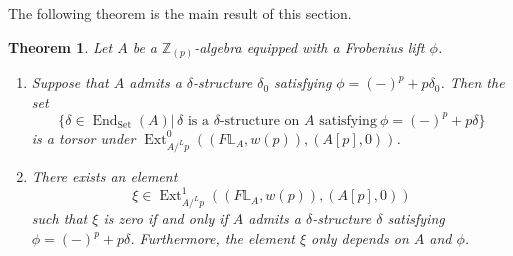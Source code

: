 \documentclass[11pt, a4paper]{amsart}
\theoremstyle{plain}
\newtheorem{theorem}{Theorem}[section]
\theoremstyle{definition}
\begin{document}
The following theorem is the main result of this section.
\begin{theorem}\label{D.2}
Let $A$ be a $\mathbb Z_{(p)}$-algebra equipped with a Frobenius lift $\phi$.
\begin{enumerate}
\item Suppose that $A$ admits a $\delta$-structure $\delta_0$ satisfying $\phi = (-)^p + p\delta_0$.
Then the set
\[\{\delta\in \operatorname{End}_{\operatorname{Set}}(A)|\,\delta \text{ is a }\delta\text{-structure on }A \text{ satisfying} \ \phi=(-)^p+p\delta\}\]
is a torsor under $\operatorname{Ext}^0_{A/^Lp}((F\mathbb L_A,w(p)),(A[p],0))$.

\item There exists an element
\[\xi\in \operatorname{Ext}^1_{A/^Lp}((F\mathbb L_A,w(p)),(A[p],0))\]
such that $\xi$ is zero if and only if $A$ admits a $\delta$-structure $\delta$ satisfying $\phi=(-)^p+p\delta$. Furthermore, the element $\xi$ only depends on $A$ and $\phi$.
\end{enumerate}
\end{theorem}
\end{document}
